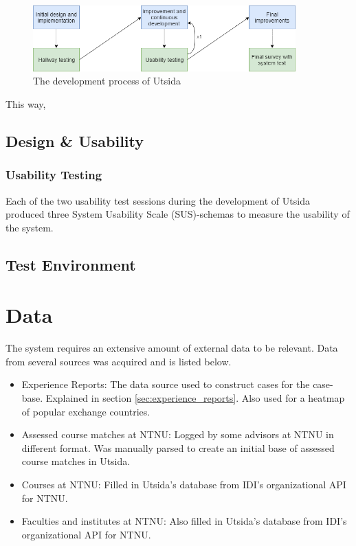 \begin{figure}[h]
    \centering
    \includegraphics[width=0.9\textwidth]{fig/development_process.png}
    \caption{The development process of Utsida}
    \label{fig:development_process}
\end{figure}

This way, 


\subsection{Design \& Usability}

\subsubsection{Usability Testing}
Each of the two usability test sessions during the development of Utsida produced three System Usability Scale (SUS)-schemas to measure the usability of the system. 


\subsection{Test Environment}


\section{Data}

The system requires an extensive amount of external data to be relevant. Data from several sources was acquired and is listed below.

\begin{itemize}
    \item Experience Reports: The data source used to construct cases for the case-base. Explained in section \ref{sec:experience_reports}. Also used for a heatmap of popular exchange countries. 
    \item Assessed course matches at NTNU: Logged by some advisors at NTNU in different format. Was manually parsed to create an initial base of assessed course matches in Utsida.
    \item Courses at NTNU: Filled in Utsida's database from IDI's organizational API for NTNU. 
    \item Faculties and institutes at NTNU: Also filled in Utsida's database from IDI's organizational API for NTNU.
\end{itemize}

